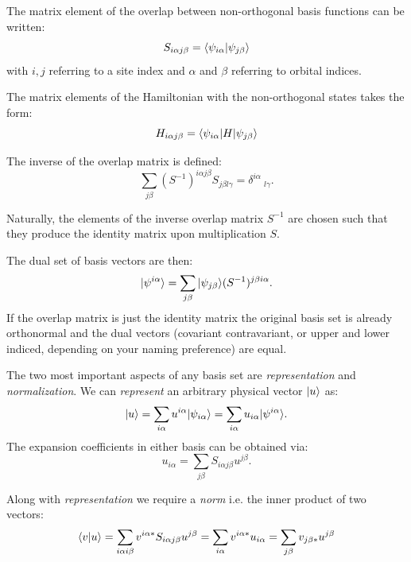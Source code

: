 The matrix element of the overlap between non-orthogonal 
basis functions can be written:
%
\begin{equation}
S_{i\alpha j\beta} = \langle \psi_{i\alpha}|\psi_{j\beta}\rangle
\end{equation}
%
with $i,j$ referring to a site index and $\alpha$ and $\beta$ 
referring to orbital indices.

The matrix elements of the Hamiltonian with the non-orthogonal states takes
the form:
%
\begin{equation}
H_{i\alpha j\beta} = \langle \psi_{i\alpha}|H|\psi_{j\beta}\rangle
\end{equation}

The inverse of the overlap matrix is defined:
%
\begin{equation}
\sum_{j\beta}(S^{-1})^{i\alpha j\beta}S_{j\beta l\gamma}=\delta^{i\alpha}\ _{l\gamma}.
\end{equation}
%

Naturally, the elements of the inverse overlap matrix $S^{-1}$ are chosen 
such that they produce the identity matrix upon multiplication $S$.

The dual set of basis vectors are then:
%
\begin{equation}
|\psi^{i\alpha}\rangle = \sum_{j\beta}|\psi_{j\beta}\rangle(S^{-1})^{j\beta i\alpha}.
\end{equation}
%
If the overlap matrix is just the identity matrix the original 
basis set is already orthonormal and the dual vectors (covariant
contravariant, or upper and lower indiced, depending
on your naming preference) are equal.

The two most important aspects of any basis set
are {\it representation} and {\it normalization}. 
We can {\it represent} an arbitrary physical 
vector $|u\rangle$ as:
%
\begin{equation}
|u\rangle = \sum_{i\alpha}u^{i\alpha}|\psi_{i\alpha}\rangle = \sum_{i\alpha}u_{i\alpha}|\psi^{i\alpha}\rangle.
\end{equation}
%
The expansion coefficients in either basis can be obtained via:
%
\begin{equation}
u_{i\alpha} = \sum_{j\beta}S_{i\alpha j\beta}u^{j\beta}.
\end{equation}
%

Along with {\it representation} we require a {\it norm} i.e. 
the inner product of two vectors:
%
\begin{equation}
\langle v|u \rangle = \sum_{i\alpha i\beta}v^{i\alpha *}S_{i\alpha j\beta}u^{j\beta} = \sum_{i\alpha}v^{i\alpha *}u_{i\alpha} 
= \sum_{j\beta}v_{j\beta *}u^{j\beta}
\end{equation}
%


